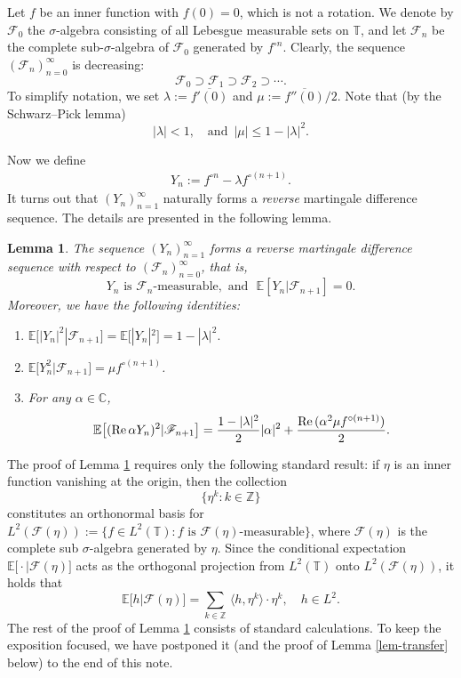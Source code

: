 \documentclass[11pt, reqno]{amsart}
\newtheorem{lemma}[theorem]{Lemma}
\theoremstyle{definition}
\newtheorem*{Brown-Eagleson Theorem}{The Brown-Eagleson Theorem}
\newcommand{\F}{\mathscr F}
\newcommand{\T}{\mathbb T}
\newcommand{\E}{\mathbb E}
\newcommand{\ol}{\overline}
\newcommand{\la}{\langle}
\newcommand{\ra}{\rangle}
\begin{document}
	Let $f$ be an inner function with $f(0)=0$, which is not a rotation. We denote by $\F_0$ the $\sigma$-algebra consisting of all Lebesgue measurable sets on $\mathbb{T}$, and let $\F_n$ be the complete sub-$\sigma$-algebra of $\F_0$ generated by $f^{\circ n}$. Clearly, the sequence $(\F_n)_{n=0}^\infty$ is decreasing: $$\F_0 \supset  \F_1 \supset \F_2 \supset \cdots.$$ To simplify notation, we set $\lambda := \overline{f'(0)}$ and $\mu:=\ol{f''(0)}/2$. Note that (by the Schwarz--Pick lemma)  $$|\lambda|<1, \quad \text{and } \, |\mu|\leq 1-|\lambda|^2.$$
	
	Now we define 
	\begin{align}\label{eq-def-Yn}
		Y_n:= f^{\circ n}-\lambda f^{\circ (n+1)}.
	\end{align} It turns out that $(Y_n)_{n=1}^\infty$ naturally forms a \emph{reverse} martingale difference sequence. The details are presented in the following lemma.


	\begin{lemma}\label{lem-Yn}
		The sequence $(Y_n)_{n=1}^\infty$ forms a reverse martingale difference sequence with respect to $(\F_n)_{n=0}^\infty$, that is, $$Y_n \text{ is $\F_n$-measurable}, \,\, \text{and }\,\, \E[Y_n|\F_{n+1}] = 0.$$
		Moreover, we have the following identities:
		\begin{enumerate}[label=(\roman*),font=\normalfont]
			\item \label{item:|Yn|2} $\E\big[|Y_n|^2 | \F_{n+1}\big]=\E\big[|Y_n|^2\big] = 1-|\lambda|^2.$
			\item \label{item:Yn2} $\E\big[Y_n^2| \F_{n+1}\big]=\mu f^{\circ (n+1)}$.
			\item \label{item:reYn2} For any $\alpha \in \mathbb C$, $$\E\big[({\rm Re}\, \alpha Y_n)^2 |\mathscr F_{n+1}\big]=\frac{1-|\lambda|^2}{2}|\alpha|^2 + \frac{{\rm Re}\,(\alpha^2 \mu f^{\circ (n+1)})}{2}.$$
		\end{enumerate}
		
	\end{lemma}
	
		The proof of Lemma \ref{lem-Yn} requires only the following standard result: if $\eta$ is an inner function vanishing at the origin, then the collection $$\{\eta^k : k\in \mathbb Z \}$$ constitutes an orthonormal basis for $L^2(\F(\eta)):=\{f\in L^2(\T): \text{$f$ is $\F(\eta)$-measurable}\}$, where $\F(\eta)$ is the complete sub $\sigma$-algebra generated by $\eta$. Since the conditional expectation $\E\big[ \cdot | \F(\eta)\big]$ acts as the orthogonal projection from  $L^2(\T)$ onto $L^2(\F(\eta))$, it holds that $$\E\big[ h| \F(\eta)\big] = \sum_{k\in \mathbb Z} \, \big\la h, \eta^k \big\ra \cdot \eta^k,\quad h\in L^2.$$ The rest of the proof of Lemma \ref{lem-Yn} consists of standard calculations. To keep the exposition focused, we have postponed it (and the proof of Lemma \ref{lem-transfer} below) to the end of this note.
\end{document}
